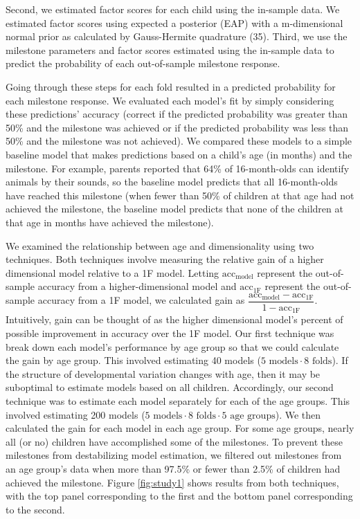 \documentclass[man]{apa7}
\begin{document}
Second, we estimated factor scores for each child using the in-sample
data. We estimated factor scores using expected a posterior (EAP) with a
m-dimensional normal prior as calculated by Gauss-Hermite quadrature
(35). Third, we use the milestone parameters and factor scores estimated
using the in-sample data to predict the probability of each
out-of-sample milestone response.

Going through these steps for each fold resulted in a predicted
probability for each milestone response. We evaluated each model's fit
by simply considering these predictions' accuracy (correct if the
predicted probability was greater than 50\% and the milestone was
achieved or if the predicted probability was less than 50\% and the
milestone was not achieved). We compared these models to a simple
baseline model that makes predictions based on a child's age (in months)
and the milestone. For example, parents reported that 64\% of
16-month-olds can identify animals by their sounds, so the baseline
model predicts that all 16-month-olds have reached this milestone (when
fewer than 50\% of children at that age had not achieved the milestone,
the baseline model predicts that none of the children at that age in
months have achieved the milestone).

We examined the relationship between age and dimensionality using two
techniques. Both techniques involve measuring the relative gain of a
higher dimensional model relative to a 1F model. Letting
\(\text{acc}_\text{model}\) represent the out-of-sample accuracy from a
higher-dimensional model and \(\text{acc}_\text{1F}\) represent the
out-of-sample accuracy from a 1F model, we calculated gain as
\(\dfrac{\text{acc}_\text{model} - \text{acc}_\text{1F}}{1 - \text{acc}_\text{1F}}\).
Intuitively, gain can be thought of as the higher dimensional model's
percent of possible improvement in accuracy over the 1F model. Our first
technique was break down each model's performance by age group so that
we could calculate the gain by age group. This involved estimating 40
models (\(5 \text{ models} \cdot 8 \text{ folds}\)). If the structure of
developmental variation changes with age, then it may be suboptimal to
estimate models based on all children. Accordingly, our second technique
was to estimate each model separately for each of the age groups. This
involved estimating 200 models
(\(5 \text{ models} \cdot 8 \text{ folds} \cdot 5 \text{ age groups}\)).
We then calculated the gain for each model in each age group. For some
age groups, nearly all (or no) children have accomplished some of the
milestones. To prevent these milestones from destabilizing model
estimation, we filtered out milestones from an age group's data when
more than 97.5\% or fewer than 2.5\% of children had achieved the
milestone. Figure \ref{fig:study1} shows results from both techniques,
with the top panel corresponding to the first and the bottom panel
corresponding to the second.
\end{document}
